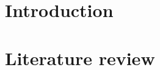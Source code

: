\documentclass[10pt,onecolumn,openright]{book}
\begin{document}
\frontmatter



\setcounter{page}{1}

\thispagestyle{empty} %
\cleardoublepage
\thispagestyle{plain}
\tableofcontents 

 

\mainmatter

\part{Introduction}
\label{part:introduction}

\label{part:literature}
\part{Literature review}
\label{part:isl}

\label{part:classifiers}

\label{part:avatar}

\label{part:rrg}



\label{part:avatartech}

\cleardoublepage{}
\end{document}
